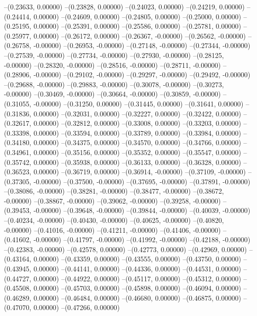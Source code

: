 --(0.23633, 0.00000)
--(0.23828, 0.00000)
--(0.24023, 0.00000)
--(0.24219, 0.00000)
--(0.24414, 0.00000)
--(0.24609, 0.00000)
--(0.24805, 0.00000)
--(0.25000, 0.00000)
--(0.25195, 0.00000)
--(0.25391, 0.00000)
--(0.25586, 0.00000)
--(0.25781, 0.00000)
--(0.25977, 0.00000)
--(0.26172, 0.00000)
--(0.26367, -0.00000)
--(0.26562, -0.00000)
--(0.26758, -0.00000)
--(0.26953, -0.00000)
--(0.27148, -0.00000)
--(0.27344, -0.00000)
--(0.27539, -0.00000)
--(0.27734, -0.00000)
--(0.27930, -0.00000)
--(0.28125, -0.00000)
--(0.28320, -0.00000)
--(0.28516, -0.00000)
--(0.28711, -0.00000)
--(0.28906, -0.00000)
--(0.29102, -0.00000)
--(0.29297, -0.00000)
--(0.29492, -0.00000)
--(0.29688, -0.00000)
--(0.29883, -0.00000)
--(0.30078, -0.00000)
--(0.30273, -0.00000)
--(0.30469, -0.00000)
--(0.30664, -0.00000)
--(0.30859, -0.00000)
--(0.31055, -0.00000)
--(0.31250, 0.00000)
--(0.31445, 0.00000)
--(0.31641, 0.00000)
--(0.31836, 0.00000)
--(0.32031, 0.00000)
--(0.32227, 0.00000)
--(0.32422, 0.00000)
--(0.32617, 0.00000)
--(0.32812, 0.00000)
--(0.33008, 0.00000)
--(0.33203, 0.00000)
--(0.33398, 0.00000)
--(0.33594, 0.00000)
--(0.33789, 0.00000)
--(0.33984, 0.00000)
--(0.34180, 0.00000)
--(0.34375, 0.00000)
--(0.34570, 0.00000)
--(0.34766, 0.00000)
--(0.34961, 0.00000)
--(0.35156, 0.00000)
--(0.35352, 0.00000)
--(0.35547, 0.00000)
--(0.35742, 0.00000)
--(0.35938, 0.00000)
--(0.36133, 0.00000)
--(0.36328, 0.00000)
--(0.36523, 0.00000)
--(0.36719, 0.00000)
--(0.36914, -0.00000)
--(0.37109, -0.00000)
--(0.37305, -0.00000)
--(0.37500, -0.00000)
--(0.37695, -0.00000)
--(0.37891, -0.00000)
--(0.38086, -0.00000)
--(0.38281, -0.00000)
--(0.38477, -0.00000)
--(0.38672, -0.00000)
--(0.38867, -0.00000)
--(0.39062, -0.00000)
--(0.39258, -0.00000)
--(0.39453, -0.00000)
--(0.39648, -0.00000)
--(0.39844, -0.00000)
--(0.40039, -0.00000)
--(0.40234, -0.00000)
--(0.40430, -0.00000)
--(0.40625, -0.00000)
--(0.40820, -0.00000)
--(0.41016, -0.00000)
--(0.41211, -0.00000)
--(0.41406, -0.00000)
--(0.41602, -0.00000)
--(0.41797, -0.00000)
--(0.41992, -0.00000)
--(0.42188, -0.00000)
--(0.42383, -0.00000)
--(0.42578, 0.00000)
--(0.42773, 0.00000)
--(0.42969, 0.00000)
--(0.43164, 0.00000)
--(0.43359, 0.00000)
--(0.43555, 0.00000)
--(0.43750, 0.00000)
--(0.43945, 0.00000)
--(0.44141, 0.00000)
--(0.44336, 0.00000)
--(0.44531, 0.00000)
--(0.44727, 0.00000)
--(0.44922, 0.00000)
--(0.45117, 0.00000)
--(0.45312, 0.00000)
--(0.45508, 0.00000)
--(0.45703, 0.00000)
--(0.45898, 0.00000)
--(0.46094, 0.00000)
--(0.46289, 0.00000)
--(0.46484, 0.00000)
--(0.46680, 0.00000)
--(0.46875, 0.00000)
--(0.47070, 0.00000)
--(0.47266, 0.00000)

